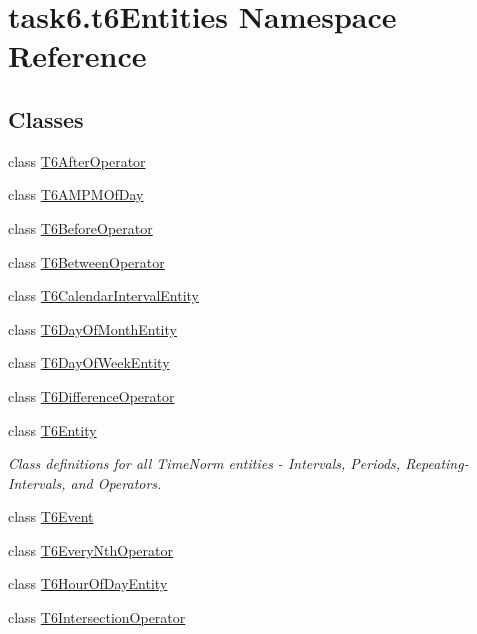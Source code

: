 \hypertarget{namespacetask6_1_1t6Entities}{}\section{task6.\+t6\+Entities Namespace Reference}
\label{namespacetask6_1_1t6Entities}
\subsection*{Classes}
\begin{DoxyCompactItemize}
\item 
class \hyperlink{classtask6_1_1t6Entities_1_1T6AfterOperator}{T6\+After\+Operator}
\item 
class \hyperlink{classtask6_1_1t6Entities_1_1T6AMPMOfDay}{T6\+A\+M\+P\+M\+Of\+Day}
\item 
class \hyperlink{classtask6_1_1t6Entities_1_1T6BeforeOperator}{T6\+Before\+Operator}
\item 
class \hyperlink{classtask6_1_1t6Entities_1_1T6BetweenOperator}{T6\+Between\+Operator}
\item 
class \hyperlink{classtask6_1_1t6Entities_1_1T6CalendarIntervalEntity}{T6\+Calendar\+Interval\+Entity}
\item 
class \hyperlink{classtask6_1_1t6Entities_1_1T6DayOfMonthEntity}{T6\+Day\+Of\+Month\+Entity}
\item 
class \hyperlink{classtask6_1_1t6Entities_1_1T6DayOfWeekEntity}{T6\+Day\+Of\+Week\+Entity}
\item 
class \hyperlink{classtask6_1_1t6Entities_1_1T6DifferenceOperator}{T6\+Difference\+Operator}
\item 
class \hyperlink{classtask6_1_1t6Entities_1_1T6Entity}{T6\+Entity}
\begin{DoxyCompactList}\small\item\em Class definitions for all Time\+Norm entities -\/ Intervals, Periods, Repeating-\/\+Intervals, and Operators. \end{DoxyCompactList}\item 
class \hyperlink{classtask6_1_1t6Entities_1_1T6Event}{T6\+Event}
\item 
class \hyperlink{classtask6_1_1t6Entities_1_1T6EveryNthOperator}{T6\+Every\+Nth\+Operator}
\item 
class \hyperlink{classtask6_1_1t6Entities_1_1T6HourOfDayEntity}{T6\+Hour\+Of\+Day\+Entity}
\item 
class \hyperlink{classtask6_1_1t6Entities_1_1T6IntersectionOperator}{T6\+Intersection\+Operator}

\end{DoxyCompactItemize}
